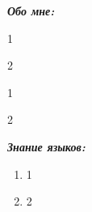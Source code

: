 \documentclass{article}
\begin{document}
\newpage
\begin{flushleft}
\textbf{\textit{Обо мне:}}
\end{flushleft}
\begin{enumerate}
\begin{minipage}{0.4\textwidth}
    \item 1
    \item 2
\end{minipage}
\hfill
\begin{minipage}{0.4\textwidth}
    \item 1
    \item 2    
\\
\end{minipage}
\end{enumerate}
\noindent \textbf{\textit{Знание языков:}}
\begin{enumerate}
    \item 1
    \item 2
\end{enumerate}
\end{document}
